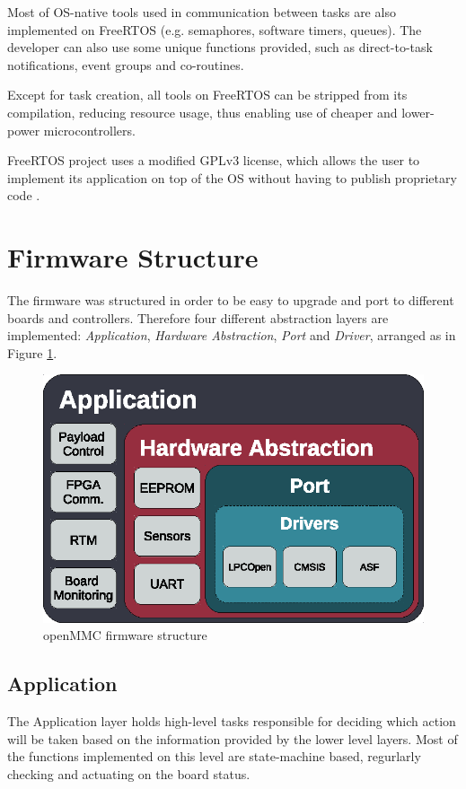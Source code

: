 \documentclass[a4paper,
              ]{jacow}
\begin{document}
Most of OS-native tools used in communication between tasks are also implemented on FreeRTOS (e.g. semaphores, software timers, queues).
The developer can also use some unique functions provided, such as direct-to-task notifications, event groups and co-routines.

Except for task creation, all tools on FreeRTOS can be stripped from its compilation, reducing resource usage, thus enabling use of cheaper and lower-power microcontrollers.

FreeRTOS project uses a modified GPLv3 license, which allows the user to implement its application on top of the OS without having to publish proprietary code \cite{freertos-license}.

\section{Firmware Structure}
The firmware was structured in order to be easy to upgrade and port to different boards and controllers.
Therefore four different abstraction layers are implemented: \emph{Application}, \emph{Hardware Abstraction}, \emph{Port} and \emph{Driver}, arranged as in Figure \ref{fig:fw-structure}.

\begin{figure}[!htb]
\centering
\includegraphics[scale=0.8]{fw-structure-dark.eps}
\caption{openMMC firmware structure}
\label{fig:fw-structure}
\end{figure}

\subsection{Application}
The Application layer holds high-level tasks responsible for deciding which action will be taken based on the information provided by the lower level layers. Most of the functions implemented on this level are state-machine based, regurlarly checking and actuating on the board status.
\end{document}
